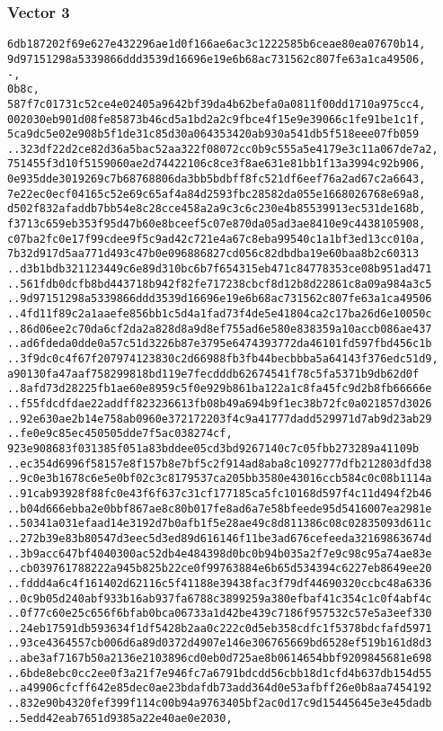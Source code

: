 \documentclass[
]{article}
\begin{document}
\hypertarget{vector-3-2}{%
\subsubsection{Vector 3}\label{vector-3-2}}

\begin{verbatim}
6db187202f69e627e432296ae1d0f166ae6ac3c1222585b6ceae80ea07670b14,
9d97151298a5339866ddd3539d16696e19e6b68ac731562c807fe63a1ca49506,
-,
0b8c,
587f7c01731c52ce4e02405a9642bf39da4b62befa0a0811f00dd1710a975cc4,
002030eb901d08fe85873b46cd5a1bd2a2c9fbce4f15e9e39066c1fe91be1c1f,
5ca9dc5e02e908b5f1de31c85d30a064353420ab930a541db5f518eee07fb059
..323df22d2ce82d36a5bac52aa322f08072cc0b9c555a5e4179e3c11a067de7a2,
751455f3d10f5159060ae2d74422106c8ce3f8ae631e81bb1f13a3994c92b906,
0e935dde3019269c7b68768806da3bb5bdbff8fc521df6eef76a2ad67c2a6643,
7e22ec0ecf04165c52e69c65af4a84d2593fbc28582da055e1668026768e69a8,
d502f832afaddb7bb54e8c28cce458a2a9c3c6c230e4b85539913ec531de168b,
f3713c659eb353f95d47b60e8bceef5c07e870da05ad3ae8410e9c4438105908,
c07ba2fc0e17f99cdee9f5c9ad42c721e4a67c8eba99540c1a1bf3ed13cc010a,
7b32d917d5aa771d493c47b0e096886827cd056c82dbdba19e60baa8b2c60313
..d3b1bdb321123449c6e89d310bc6b7f654315eb471c84778353ce08b951ad471
..561fdb0dcfb8bd443718b942f82fe717238cbcf8d12b8d22861c8a09a984a3c5
..9d97151298a5339866ddd3539d16696e19e6b68ac731562c807fe63a1ca49506
..4fd11f89c2a1aaefe856bb1c5d4a1fad73f4de5e41804ca2c17ba26d6e10050c
..86d06ee2c70da6cf2da2a828d8a9d8ef755ad6e580e838359a10accb086ae437
..ad6fdeda0dde0a57c51d3226b87e3795e6474393772da46101fd597fbd456c1b
..3f9dc0c4f67f207974123830c2d66988fb3fb44becbbba5a64143f376edc51d9,
a90130fa47aaf758299818bd119e7fecdddb62674541f78c5fa5371b9db62d0f
..8afd73d28225fb1ae60e8959c5f0e929b861ba122a1c8fa45fc9d2b8fb66666e
..f55fdcdfdae22addff823236613fb08b49a694b9f1ec38b72fc0a021857d3026
..92e630ae2b14e758ab0960e372172203f4c9a41777dadd529971d7ab9d23ab29
..fe0e9c85ec450505dde7f5ac038274cf,
923e908683f031385f051a83bddee05cd3bd9267140c7c05fbb273289a41109b
..ec354d6996f58157e8f157b8e7bf5c2f914ad8aba8c1092777dfb212803dfd38
..9c0e3b1678c6e5e0bf02c3c8179537ca205bb3580e43016ccb584c0c08b1114a
..91cab93928f88fc0e43f6f637c31cf177185ca5fc10168d597f4c11d494f2b46
..b04d666ebba2e0bbf867ae8c80b017fe8ad6a7e58bfeede95d5416007ea2981e
..50341a031efaad14e3192d7b0afb1f5e28ae49c8d811386c08c02835093d611c
..272b39e83b80547d3eec5d3ed89d616146f11be3ad676cefeeda32169863674d
..3b9acc647bf4040300ac52db4e484398d0bc0b94b035a2f7e9c98c95a74ae83e
..cb039761788222a945b825b22ce0f99763884e6b65d534394c6227eb8649ee20
..fddd4a6c4f161402d62116c5f41188e39438fac3f79df44690320ccbc48a6336
..0c9b05d240abf933b16ab937fa6788c3899259a380efbaf41c354c1c0f4abf4c
..0f77c60e25c656f6bfab0bca06733a1d42be439c7186f957532c57e5a3eef330
..24eb17591db593634f1df5428b2aa0c222c0d5eb358cdfc1f5378bdcfafd5971
..93ce4364557cb006d6a89d0372d4907e146e306765669bd6528ef519b161d8d3
..abe3af7167b50a2136e2103896cd0eb0d725ae8b0614654bbf9209845681e698
..6bde8ebc0cc2ee0f3a21f7e946fc7a6791bdcdd56cbb18d1cfd4b637db154d55
..a49906cfcff642e85dec0ae23bdafdb73add364d0e53afbff26e0b8aa7454192
..832e90b4320fef399f114c00b94a9763405bf2ac0d17c9d15445645e3e45dadb
..5edd42eab7651d9385a22e40ae0e2030,
\end{verbatim}
\end{document}

